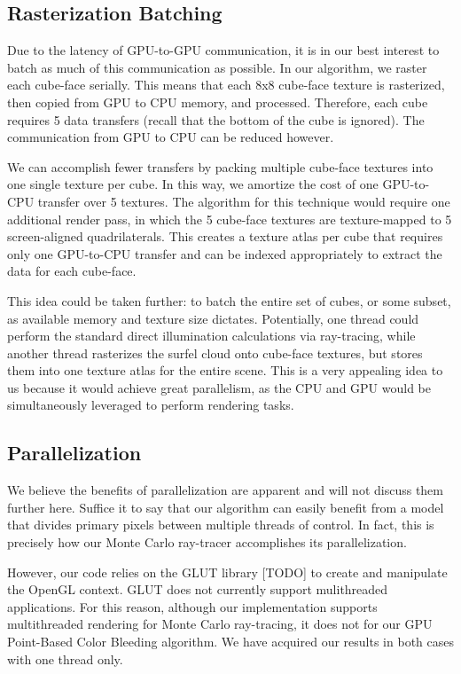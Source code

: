 \subsection{Rasterization Batching}
\label{sec:batching}
Due to the latency of GPU-to-GPU communication, it is in our best interest to batch as much of this communication as possible. In our algorithm, we raster each cube-face serially. This means that each 8x8 cube-face texture is rasterized, then copied from GPU to CPU memory, and processed. Therefore, each cube requires 5 data transfers (recall that the bottom of the cube is ignored). The communication from GPU to CPU can be reduced however.

We can accomplish fewer transfers by packing multiple cube-face textures into one single texture per cube. In this way, we amortize the cost of one GPU-to-CPU transfer over 5 textures. The algorithm for this technique would require one additional render pass, in which the 5 cube-face textures are texture-mapped to 5 screen-aligned quadrilaterals. This creates a texture atlas per cube that requires only one GPU-to-CPU transfer and can be indexed appropriately to extract the data for each cube-face.

This idea could be taken further: to batch the entire set of cubes, or some subset, as available memory and texture size dictates. Potentially, one thread could perform the standard direct illumination calculations via ray-tracing, while another thread rasterizes the surfel cloud onto cube-face textures, but stores them into one texture atlas for the entire scene. This is a very appealing idea to us because it would achieve great parallelism, as the CPU and GPU would be simultaneously leveraged to perform rendering tasks.

\subsection{Parallelization}
We believe the benefits of parallelization are apparent and will not discuss them further here. Suffice it to say that our algorithm can easily benefit from a model that divides primary pixels between multiple threads of control. In fact, this is precisely how our Monte Carlo ray-tracer accomplishes its parallelization. 

However, our code relies on the GLUT library [TODO] to create and manipulate the OpenGL context. GLUT does not currently support mulithreaded applications. For this reason, although our implementation supports multithreaded rendering for Monte Carlo ray-tracing, it does not for our GPU Point-Based Color Bleeding algorithm. We have acquired our results in both cases with one thread only.
 
